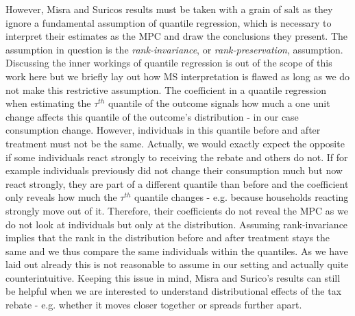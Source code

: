 However, Misra and Suricos results must be taken with a grain of salt as they ignore a fundamental assumption of quantile regression, which is necessary to interpret their estimates as the MPC and draw the conclusions they present. The assumption in question is the \textit{rank-invariance}, or \textit{rank-preservation}, assumption. Discussing the inner workings of quantile regression is out of the scope of this work here but we briefly lay out how MS interpretation is flawed as long as we do not make this restrictive assumption. The coefficient in a quantile regression when estimating the $\tau^{th}$ quantile of the outcome signals how much a one unit change affects this quantile of the outcome's distribution - in our case consumption change. However, individuals in this quantile before and after treatment must not be the same. Actually, we would exactly expect the opposite if some individuals react strongly to receiving the rebate and others do not. If for example individuals previously did not change their consumption much but now react strongly, they are part of a different quantile than before and the coefficient only reveals how much the $\tau^{th}$ quantile changes - e.g. because households reacting strongly move out of it. Therefore, their coefficients do not reveal the MPC as we do not look at individuals but only at the distribution. Assuming rank-invariance implies that the rank in the distribution before and after treatment stays the same and we thus compare the same individuals within the quantiles. As we have laid out already this is not reasonable to assume in our setting and actually quite counterintuitive. Keeping this issue in mind, Misra and Surico's results can still be helpful when we are interested to understand distributional effects of the tax rebate - e.g. whether it moves closer together or spreads further apart.